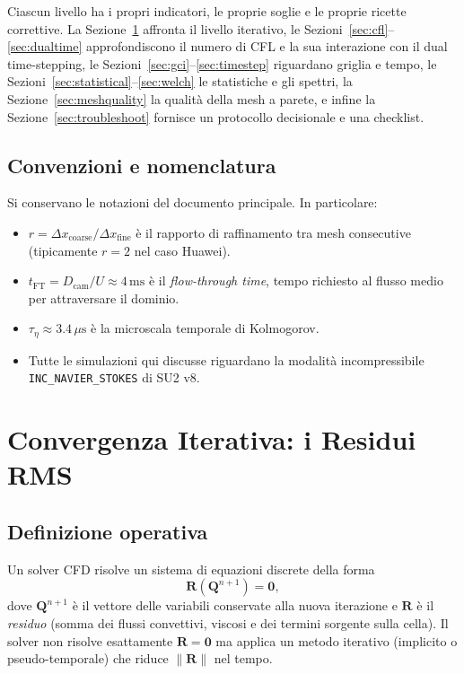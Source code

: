 \documentclass[11pt,a4paper]{article}
\newcommand{\ttcfg}[1]{\texttt{\color{codegray}#1}}
\newcommand{\Dcam}{D_{\mathrm{cam}}}
\newcommand{\mus}{\,\mu\mathrm{s}}
\providecommand{\ms}{}\renewcommand{\ms}{\,\mathrm{ms}}
\newcommand{\tFT}{t_{\mathrm{FT}}}
\begin{document}
Ciascun livello ha i propri indicatori, le proprie soglie e le proprie
ricette correttive. La Sezione~\ref{sec:residui} affronta il livello
iterativo, le Sezioni~\ref{sec:cfl}--\ref{sec:dualtime} approfondiscono
il numero di CFL e la sua interazione con il dual time-stepping, le
Sezioni~\ref{sec:gci}--\ref{sec:timestep} riguardano griglia e tempo,
le Sezioni~\ref{sec:statistical}--\ref{sec:welch} le statistiche e gli
spettri, la Sezione~\ref{sec:meshquality} la qualità della mesh a
parete, e infine la Sezione~\ref{sec:troubleshoot} fornisce un
protocollo decisionale e una checklist.

\subsection{Convenzioni e nomenclatura}

Si conservano le notazioni del documento principale. In particolare:
\begin{itemize}
  \item $r = \Delta x_{\mathrm{coarse}}/\Delta x_{\mathrm{fine}}$ è il
    rapporto di raffinamento tra mesh consecutive (tipicamente $r=2$
    nel caso Huawei).
  \item $\tFT = \Dcam/U \approx 4\ms$ è il \emph{flow-through time},
    tempo richiesto al flusso medio per attraversare il dominio.
  \item $\tau_\eta \approx 3.4\mus$ è la microscala temporale di
    Kolmogorov.
  \item Tutte le simulazioni qui discusse riguardano la modalità
    incompressibile \ttcfg{INC\_NAVIER\_STOKES} di SU2 v8.
\end{itemize}

\section{Convergenza Iterativa: i Residui RMS}
\label{sec:residui}

\subsection{Definizione operativa}

Un solver CFD risolve un sistema di equazioni discrete della forma
\begin{equation}
  \mathbf{R}(\mathbf{Q}^{n+1}) = \mathbf{0},
\end{equation}
dove $\mathbf{Q}^{n+1}$ è il vettore delle variabili conservate alla
nuova iterazione e $\mathbf{R}$ è il \emph{residuo} (somma dei flussi
convettivi, viscosi e dei termini sorgente sulla cella). Il solver
non risolve esattamente $\mathbf{R}=\mathbf{0}$ ma applica un metodo
iterativo (implicito o pseudo-temporale) che riduce $\|\mathbf{R}\|$
nel tempo.
\end{document}
